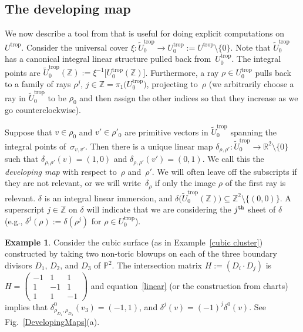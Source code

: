\documentclass[pdftex]{sigma}
\numberwithin{equation}{section}
\numberwithin{figure}{section}
\numberwithin{table}{section}
\DeclareMathOperator{\trop}{trop}
\let\bb=\mathbb
\let\rar=\rightarrow
\let\wt=\widetilde
\theoremstyle{definition}
\newtheorem{eg}[thm]{Example}
\begin{document}
\subsection{The developing map}\label{dev}

We now describe a tool from \cite{GHK1} that is useful for doing explicit computations on $U^{\trop}$. Consider the universal cover $\xi\colon \wt{U}_0^{\trop} \rar U^{\trop}_0:=U^{\trop}\setminus \{0\}$. Note that $\wt{U}_0^{\trop}$ has a canonical integral linear structure pulled back from~$U^{\trop}_0$. The integral points are $\wt{U}_0^{\trop}(\bb{Z}) := \xi^{-1}\big[U^{\trop}_0(\bb{Z})\big]$. Furthermore, a ray $\rho\in U^{\trop}_0$ pulls back to a family of rays $\rho^j$, $j\in \bb{Z}=\pi_1\big(U^{\trop}_0\big)$, projecting to~$\rho$ (we arbitrarily choose a ray in $\wt{U}_0^{\trop}$ to be $\rho_0$ and then assign the other indices so that they increase as we go counterclockwise).

Suppose that $v \in \rho_0$ and $v' \in \rho'_0$ are primitive vectors in $\wt{U}_0^{\trop}$ spanning the integral points of~$\sigma_{v,v'}$.
 Then there is a unique linear map $\delta_{\rho,\rho'}\colon \wt{U}_0^{\trop} \rar \bb{R}^2\setminus\{0\}$ such that $\delta_{\rho,\rho'}(v)=(1,0)$ and $\delta_{\rho,\rho'}(v')=(0,1)$. We call this the {\it developing map} with respect to~$\rho$ and~$\rho'$.
 We will often leave off the subscripts if they are not relevant, or we will write~$\delta_{\rho}$ if only
the image $\rho$ of the first ray is relevant. $\delta$ is an integral linear immersion, and $\delta\big(\wt{U}_0^{\trop}(\bb{Z})\big) \subseteq \bb{Z}^2\setminus \{(0,0)\}$. A superscript $j\in \bb{Z}$ on $\delta$ will indicate that we are considering the $j^{\tt{th}}$ sheet of $\delta$ (e.g., $\delta^j(\rho):=\delta(\rho^j)$ for $\rho\in U^{\trop}_0$).

\begin{eg} \label{cubicdevelop}
Consider the cubic surface (as in Example~\ref{cubic cluster}) constructed by taking two non-toric blowups on each of the three boundary divisors $D_1$, $D_2$, and $D_3$ of $\bb{P}^2$. The intersection matrix $H:=(D_i \cdot D_j)$ is $
H=	\left(\begin{smallmatrix}
		-1 &1 & 1 \\
		1 &-1 & 1 \\
		1 &1 & -1
		\end{smallmatrix}\right)
$
and equation~\eqref{linear} (or the construction from charts) implies that $\delta^0_{\rho_{D_1},\rho_{D_2}}(v_3) = (-1,1)$, and $\delta^j(v) = (-1)^j\delta^0(v)$. See Fig.~\ref{DevelopingMaps}(a).
\end{eg}
\end{document}
